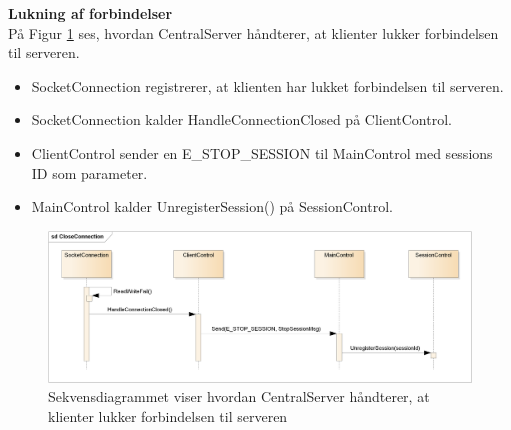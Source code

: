 \textbf{Lukning af forbindelser}\\
På Figur \ref{fig:CSCloseConnection} ses, hvordan CentralServer håndterer, at klienter lukker forbindelsen til serveren.

\begin{itemize}
  \item SocketConnection registrerer, at klienten har lukket forbindelsen til serveren.
  \item SocketConnection kalder HandleConnectionClosed på ClientControl.
  \item ClientControl sender en E\_STOP\_SESSION til MainControl med sessions ID som parameter.
  \item MainControl kalder UnregisterSession() på SessionControl.
\end{itemize}

\begin{figure}[H]
    \centering
    \includegraphics[width=1\textwidth]{Systemdesign/CentralServer/Images/CloseConnection.png}
    \caption{Sekvensdiagrammet viser hvordan CentralServer håndterer, at klienter lukker forbindelsen til serveren}
    \label{fig:CSCloseConnection}
\end{figure}

